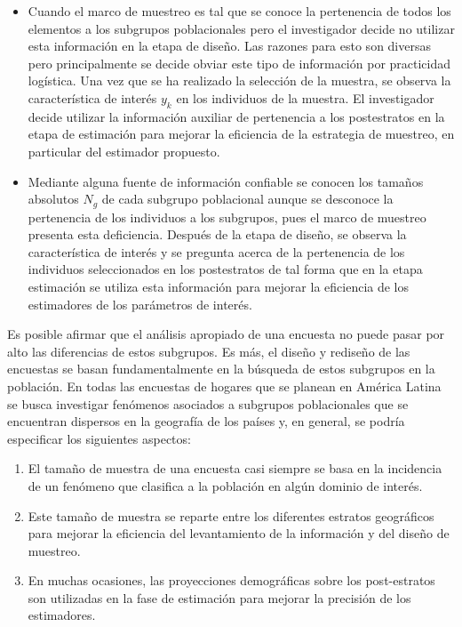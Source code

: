 \documentclass[
  12pt,
  spanish,
]{book}
\providecommand{\tightlist}{%
  \setlength{\itemsep}{0pt}\setlength{\parskip}{0pt}}
\begin{document}
\begin{itemize}
  \begin{itemize}
  \tightlist
  \item
    Cuando el marco de muestreo es tal que se conoce la pertenencia de todos los elementos a los subgrupos poblacionales pero el investigador decide no utilizar esta información en la etapa de diseño. Las razones para esto son diversas pero principalmente se decide obviar este tipo de información por practicidad logística. Una vez que se ha realizado la selección de la muestra, se observa la característica de interés \(y_k\) en los individuos de la muestra. El investigador decide utilizar la información auxiliar de pertenencia a los postestratos en la etapa de estimación para mejorar la eficiencia de la estrategia de muestreo, en particular del estimador propuesto.
  \item
    Mediante alguna fuente de información confiable se conocen los tamaños absolutos \(N_g\) de cada subgrupo poblacional aunque se desconoce la pertenencia de los individuos a los subgrupos, pues el marco de muestreo presenta esta deficiencia. Después de la etapa de diseño, se observa la característica de interés y se pregunta acerca de la pertenencia de los individuos seleccionados en los postestratos de tal forma que en la etapa estimación se utiliza esta información para mejorar la eficiencia de los estimadores de los parámetros de interés.
  \end{itemize}
\end{itemize}

Es posible afirmar que el análisis apropiado de una encuesta no puede pasar por alto las diferencias de estos subgrupos. Es más, el diseño y rediseño de las encuestas se basan fundamentalmente en la búsqueda de estos subgrupos en la población. En todas las encuestas de hogares que se planean en América Latina se busca investigar fenómenos asociados a subgrupos poblacionales que se encuentran dispersos en la geografía de los países y, en general, se podría especificar los siguientes aspectos:

\begin{enumerate}
\def\labelenumi{\arabic{enumi}.}
\tightlist
\item
  El tamaño de muestra de una encuesta casi siempre se basa en la incidencia de un fenómeno que clasifica a la población en algún dominio de interés.
\item
  Este tamaño de muestra se reparte entre los diferentes estratos geográficos para mejorar la eficiencia del levantamiento de la información y del diseño de muestreo.
\item
  En muchas ocasiones, las proyecciones demográficas sobre los post-estratos son utilizadas en la fase de estimación para mejorar la precisión de los estimadores.
\end{enumerate}
\end{document}
